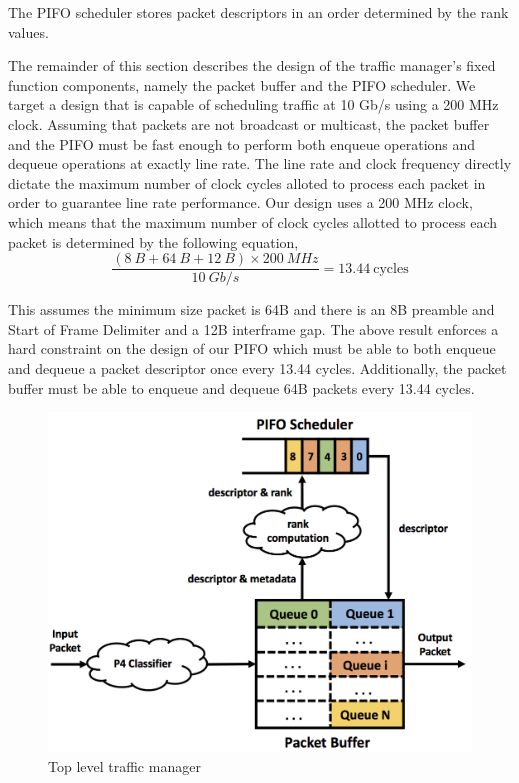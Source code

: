 The PIFO scheduler stores packet descriptors in an order determined by the rank values.

The remainder of this section describes the design of the traffic manager's fixed function components, namely the packet buffer and the PIFO scheduler. We target a design that is capable of scheduling traffic at 10 Gb/s using a 200 MHz clock. Assuming that packets are not broadcast or multicast, the packet buffer and the PIFO must be fast enough to perform both enqueue operations and dequeue operations at exactly line rate. The line rate and clock frequency directly dictate the maximum number of clock cycles alloted to process each packet in order to guarantee line rate performance. Our design uses a 200 MHz clock, which means that the maximum number of clock cycles allotted to process each packet is determined by the following equation,
$$ \frac{(8~B + 64~B + 12~B)\times 200~MHz}{10~Gb/s} = 13.44~\mbox{cycles} $$

This assumes the minimum size packet is 64B and there is an 8B preamble and Start of Frame Delimiter and a 12B interframe gap. The above result enforces a hard constraint on the design of our PIFO which must be able to both enqueue and dequeue a packet descriptor once every 13.44 cycles. Additionally, the packet buffer must be able to enqueue and dequeue 64B packets every 13.44 cycles.

\begin{figure}[!ht]
\includegraphics[width=1\linewidth]{figures/design/pifo-tm}
\caption{Top level traffic manager}
\label{fig:pifo-tm}
\end{figure}

